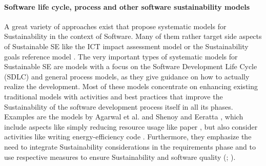 \documentclass[oribibl]{llncs}
\begin{document}
\paragraph{Software life cycle, process and other software sustainability models}
A great variety of approaches exist that propose systematic models for Sustainability in the context of Software. Many of them rather target side aspects of Sustainable SE like the ICT impact assessment model \cite{hilty_relevance_2006} or the Sustainability goals reference model \cite{penzenstadler_generic_2013}.
 The very important types of systematic models for Sustainable SE are models with a focus on the Software Development Life Cycle (SDLC) and general process models, as they give guidance on how to actually realize the development. Most of these models concentrate on enhancing existing traditional models with activities and best practices that improve the Sustainability of the software development process itself in all its phases. Examples are the models by Agarwal et al. \cite{agarwal_sustainable_2012} and Shenoy and Eeratta \cite{shenoy_green_2011}, which include aspects like simply reducing resource usage like paper \cite{shenoy_green_2011}, but also consider activities like writing energy-efficiency code \cite{agarwal_sustainable_2012}. Furthermore, they emphasize the need to integrate Sustainability considerations in the requirements phase and to use respective measures to ensure Sustainability and software quality (\cite{agarwal_sustainable_2012}; \cite{shenoy_green_2011}).\\ %
\end{document}
